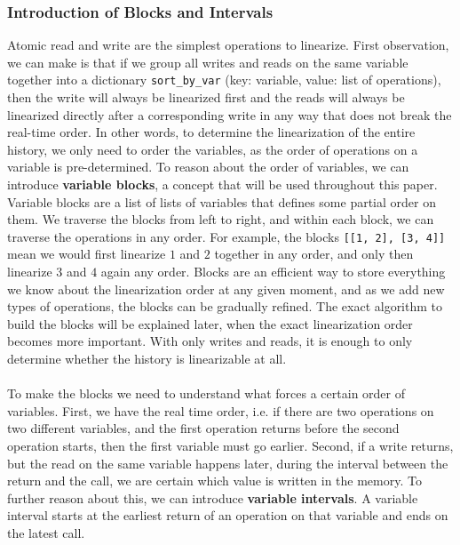 \documentclass[oneside, a4paper, onecolumn, 10pt]{article}
\begin{document}
\subsubsection{Introduction of Blocks and Intervals}
Atomic read and write are the simplest operations to linearize. First observation, we can make is that if we group all writes and reads on the same variable together into a dictionary \verb|sort_by_var| (key: variable, value: list of operations), then the write will always be linearized first and the reads will always be linearized directly after a corresponding write in any way that does not break the real-time order. In other words, to determine the linearization of the entire history, we only need to order the variables, as the order of operations on a variable is pre-determined. To reason about the order of variables, we can introduce \textbf{variable blocks}, a concept that will be used throughout this paper. Variable blocks are a list of lists of variables that defines some partial order on them. We traverse the blocks from left to right, and within each block, we can traverse the operations in any order. For example, the blocks \verb|[[1, 2], [3, 4]]| mean we would first linearize $1$ and $2$ together in any order, and only then linearize $3$ and $4$ again any order. Blocks are an efficient way to store everything we know about the linearization order at any given moment, and as we add new types of operations, the blocks can be gradually refined. The exact algorithm to build the blocks will be explained later, when the exact linearization order becomes more important. With only writes and reads, it is enough to only determine whether the history is linearizable at all. \\\\
To make the blocks we need to understand what forces a certain order of variables. First, we have the real time order, i.e. if there are two operations on two different variables, and the first operation returns before the second operation starts, then the first variable must go earlier. Second, if a write returns, but the read on the same variable happens later, during the interval between the return and the call, we are certain which value is written in the memory. To further reason about this, we can introduce \textbf{variable intervals}. A variable interval starts at the earliest return of an operation on that variable and ends on the latest call.
\end{document}
